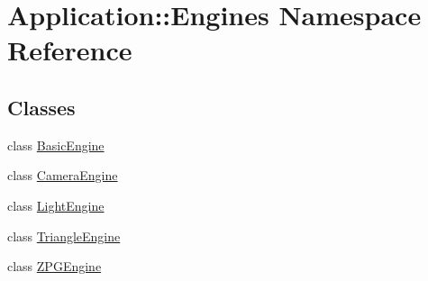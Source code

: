 \hypertarget{namespaceApplication_1_1Engines}{}\section{Application\+:\+:Engines Namespace Reference}
\label{namespaceApplication_1_1Engines}
\subsection*{Classes}
\begin{DoxyCompactItemize}
\item 
class \mbox{\hyperlink{classApplication_1_1Engines_1_1BasicEngine}{Basic\+Engine}}
\item 
class \mbox{\hyperlink{classApplication_1_1Engines_1_1CameraEngine}{Camera\+Engine}}
\item 
class \mbox{\hyperlink{classApplication_1_1Engines_1_1LightEngine}{Light\+Engine}}
\item 
class \mbox{\hyperlink{classApplication_1_1Engines_1_1TriangleEngine}{Triangle\+Engine}}
\item 
class \mbox{\hyperlink{classApplication_1_1Engines_1_1ZPGEngine}{Z\+P\+G\+Engine}}
\end{DoxyCompactItemize}

